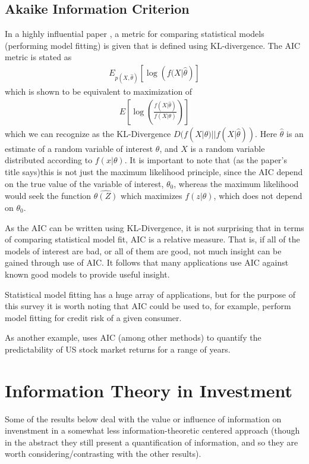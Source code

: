 \documentclass[10pt, twocolumn]{IEEEtran}
\begin{document}
\subsection{Akaike Information Criterion}
In a highly influential paper \cite{Akaike1998}, a metric for comparing statistical models (performing model fitting)
is given that is defined using KL-divergence. The AIC metric is stated as
\begin{gather*}
  E_{p(X, \hat{\theta})}\left[\log\left(f(X|\hat{\theta}\right)\right]
\end{gather*}
which is shown to be equivalent to maximization of
\begin{gather*}
  E\left[\log\left(\frac{f(X|\hat{\theta})}{f(X|\theta)}\right)\right]
\end{gather*}
which we can recognize as the KL-Divergence $D(f(X|\theta) || f(X|\hat{\theta}))$. Here $\hat{\theta}$ is
an estimate of a random variable of interest $\theta$, and $X$ is a random variable distributed according to 
$f(x|\theta)$. It is important to note that (as the paper's title says)this is not just the maximum
likelihood principle, since the AIC depend on the true value of the variable of interest, $\theta_{0}$,
whereas the maximum likelihood would seek the function $\hat{\theta(Z)}$ which maximizes $f(z|\theta)$,
which does not depend on $\theta_{0}$.

As the AIC can be written using KL-Divergence, it is not surprising that in terms of comparing statistical model
fit, AIC is a relative measure. That is, if all of the models of interest are bad, or all of them are good, not
much insight can be gained through use of AIC. It follows that many applications use AIC against known good models
to provide useful insight.

Statistical model fitting has a huge array of applications, but for the purpose of this survey it is worth noting that
AIC could be used to, for example, perform model fitting for credit risk of a given consumer.

As another example, \cite{Pesaran1995} uses AIC (among other methods) to quantify the predictability
of US stock market returns for a range of years.

\section{Information Theory in Investment}
Some of the results below deal with the value or influence of information on invenstment in a
somewhat less information-theoretic centered approach (though in the abstract they still present
a quantification of information, and so they are worth considering/contrasting with the other
results).
\end{document}
